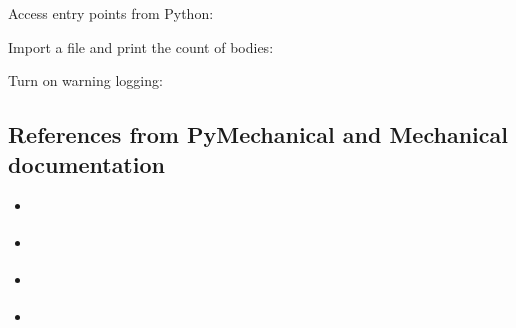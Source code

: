 \documentclass[9pt,landscape]{article}
\begin{document}
\begin{multicols}{3}
Access entry points from Python: 
 


Import a file and print the count of bodies:


Turn on warning logging:


\subsection{References from PyMechanical and Mechanical documentation}
\begin{multicols}{2}
\begin{itemize}
    \item \href{https://mechanical.docs.pyansys.com/version/stable/getting_started/index.html}{\color{blue}{Getting started}}
    \item \href{https://mechanical.docs.pyansys.com/version/stable/examples/index.html}{\color{blue}{Examples}}
    \item \href{https://mechanical.docs.pyansys.com/version/stable/api/index.html}{\color{blue}{API reference}}
    \item \href{https://ansyshelp.ansys.com/account/secured?returnurl=/Views/Secured/corp/v231/en/act_script/act_script.html}{\color{blue}{Scripting in Mechanical Guide}}
\end{itemize}
\end{multicols}
\end{multicols}
\end{document}
